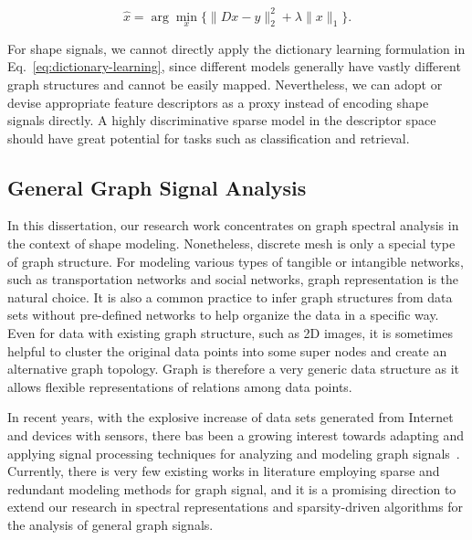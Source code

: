 \begin{equation}
\hat{x} = \arg\min_{x} \{\|Dx - y\|_2^2 + \lambda\|x\|_1\}.
\end{equation}

For shape signals, we cannot directly apply the dictionary learning formulation in
Eq.~\ref{eq:dictionary-learning}, since different models generally have vastly different
graph structures and cannot be easily mapped. Nevertheless, we can adopt or devise appropriate
feature descriptors as a proxy instead of encoding shape signals directly. A highly discriminative
sparse model in the descriptor space should have great potential for tasks such as classification 
and retrieval.

\subsection*{General Graph Signal Analysis}
In this dissertation, our research work concentrates on graph spectral analysis in the context 
of shape modeling. Nonetheless, discrete mesh is only a special type of graph structure. For modeling 
various types of tangible or intangible networks, such as transportation networks and social networks,
graph representation is the natural choice. It is also a common practice to infer graph structures
from data sets without pre-defined networks to help organize the data in a specific way. 
Even for data with existing graph structure, such as 2D images, it is sometimes helpful to cluster 
the original data points into some super nodes and create an alternative graph topology.  
Graph is therefore a very generic data structure as it allows flexible representations of 
relations among data points. 

In recent years, with the explosive increase of data sets generated from Internet and devices 
with sensors, there bas been a growing interest towards adapting and applying signal processing 
techniques for analyzing and modeling graph signals~\cite{ShumanNarangFrossardEtAl2013, SandryhailaMoura2014}.
Currently, there is very few existing works in literature employing sparse and redundant modeling 
methods for graph signal, and it is a promising direction to extend our research in spectral 
representations and sparsity-driven algorithms for the analysis of general graph signals.

